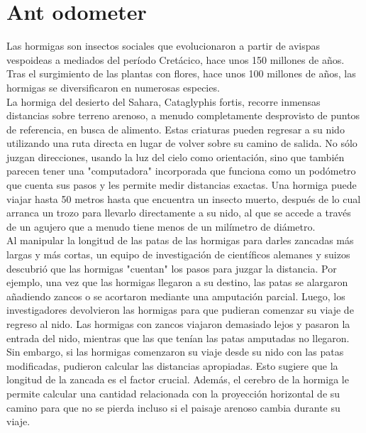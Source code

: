 \section*{Ant odometer}

\noindent Las hormigas son insectos sociales que evolucionaron a partir de avispas vespoideas a mediados del período Cretácico, hace unos 150 millones de años. Tras el surgimiento de las plantas con flores, hace unos 100 millones de años, las hormigas se diversificaron en numerosas especies.\\

\noindent La hormiga del desierto del Sahara, Cataglyphis fortis, recorre inmensas distancias sobre terreno arenoso, a menudo completamente desprovisto de puntos de referencia, en busca de alimento. Estas criaturas pueden regresar a su nido utilizando una ruta directa en lugar de volver sobre su camino de salida. No sólo juzgan direcciones, usando la luz del cielo como orientación, sino que también parecen tener una "computadora" incorporada que funciona como un podómetro que cuenta sus pasos y les permite medir distancias exactas. Una hormiga puede viajar hasta 50 metros hasta que encuentra un insecto muerto, después de lo cual arranca un trozo para llevarlo directamente a su nido, al que se accede a través de un agujero que a menudo tiene menos de un milímetro de diámetro.\\

\noindent Al manipular la longitud de las patas de las hormigas para darles zancadas más largas y más cortas, un equipo de investigación de científicos alemanes y suizos descubrió que las hormigas "cuentan" los pasos para juzgar la distancia. Por ejemplo, una vez que las hormigas llegaron a su destino, las patas se alargaron añadiendo zancos o se acortaron mediante una amputación parcial. Luego, los investigadores devolvieron las hormigas para que pudieran comenzar su viaje de regreso al nido. Las hormigas con zancos viajaron demasiado lejos y pasaron la entrada del nido, mientras que las que tenían las patas amputadas no llegaron. Sin embargo, si las hormigas comenzaron su viaje desde su nido con las patas modificadas, pudieron calcular las distancias apropiadas. Esto sugiere que la longitud de la zancada es el factor crucial. Además, el cerebro de la hormiga le permite calcular una cantidad relacionada con la proyección horizontal de su camino para que no se pierda incluso si el paisaje arenoso cambia durante su viaje.